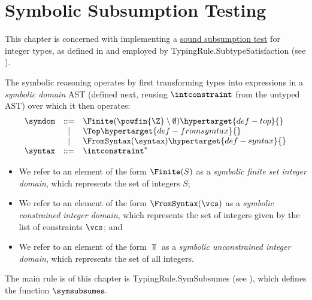 \chapter{Symbolic Subsumption Testing\label{chap:SymbolicSubsumptionTesting}}
This chapter is concerned with implementing a \hyperlink{def-soundsubsumptiontest}{sound subsumption test}
for integer types, as defined in  and employed by
TypingRule.SubtypeSatisfaction (see ).

\hypertarget{def-symbolicdomain}{}
The symbolic reasoning operates by first transforming types into expressions in a \emph{symbolic domain} AST
(defined next, reusing $\intconstraint$ from the untyped AST) over which it then operates:
\hypertarget{def-symdom}{}
\hypertarget{def-finite}{}
\[
  \begin{array}{rcl}
    \symdom &::=& \Finite(\powfin{\Z} \setminus \emptyset) \hypertarget{def-top}{}\\
            &|  & \Top                      \hypertarget{def-fromsymtax}{}\\
            &|  & \FromSyntax(\syntax)      \hypertarget{def-syntax}{}\\
    \syntax &::=& \intconstraint^*
  \end{array}
\]

\begin{itemize}
  \item We refer to an element of the form $\Finite(S)$ as a \emph{symbolic finite set integer domain},
        which represents the set of integers $S$;
  \item We refer to an element of the form $\FromSyntax(\vcs)$ as a \emph{symbolic constrained integer domain},
        which represents the set of integers given by the list of constraints $\vcs$; and
  \item We refer to an element of the form $\Top$ as a \emph{symbolic unconstrained integer domain},
        which represents the set of all integers.
\end{itemize}

The main rule is of this chapter is TypingRule.SymSubsumes (see ), which defines the function
$\symsubsumes$.

